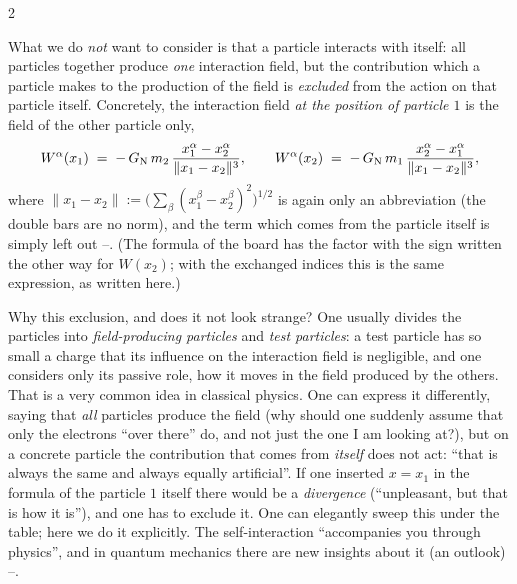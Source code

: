 \begin{paracol}{2}
\begin{definition}\label{def:tb-self}
What we do \emph{not} want to consider is that a particle interacts with itself: all particles together produce \emph{one} interaction field, but the contribution which a particle makes to the production of the field is \emph{excluded} from the action on that particle itself. Concretely, the interaction field \emph{at the position of particle $1$} is the field of the other particle only,
\begin{equation}\label{eq:tb-selfex}
  W^\alpha(x_1)\;=\;-\,G_{\rm N}\,m_2\,\frac{x_1^\alpha-x_2^\alpha}{\|x_1-x_2\|^3},\qquad
  W^\alpha(x_2)\;=\;-\,G_{\rm N}\,m_1\,\frac{x_2^\alpha-x_1^\alpha}{\|x_1-x_2\|^3},
\end{equation}
where $\|x_1-x_2\|:=\bigl(\sum_\beta(x_1^\beta-x_2^\beta)^2\bigr)^{1/2}$ is again only an abbreviation (the double bars are no norm), and the term which comes from the particle itself is simply left out --. (The formula of the board has the factor with the sign written the other way for $W(x_2)$; with the exchanged indices this is the same expression, as written here.)
\end{definition}

\begin{coursenote}\label{cn:tb-self}
Why this exclusion, and does it not look strange? One usually divides the particles into \emph{field-producing particles} and \emph{test particles}: a test particle has so small a charge that its influence on the interaction field is negligible, and one considers only its passive role, how it moves in the field produced by the others. That is a very common idea in classical physics.
One can express it differently, saying that \emph{all} particles produce the field (why should one suddenly assume that only the electrons ``over there'' do, and not just the one I am looking at?), but on a concrete particle the contribution that comes from \emph{itself} does not act: ``that is always the same and always equally artificial''. If one inserted $x=x_1$ in the formula of the particle $1$ itself there would be a \emph{divergence} (``unpleasant, but that is how it is''), and one has to exclude it.
One can elegantly sweep this under the table; here we do it explicitly. The self-interaction ``accompanies you through physics'', and in quantum mechanics there are new insights about it (an outlook) --.
\end{coursenote}


\end{paracol}
